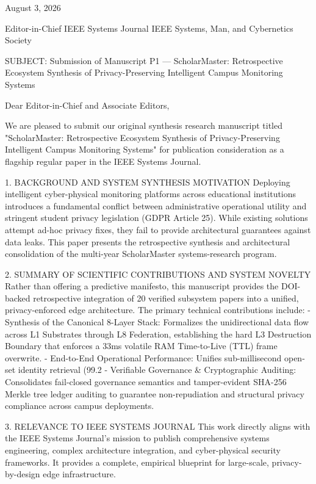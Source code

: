 August 3, 2026

Editor-in-Chief
IEEE Systems Journal
IEEE Systems, Man, and Cybernetics Society

SUBJECT: Submission of Manuscript P1 — ScholarMaster: Retrospective Ecosystem Synthesis of Privacy-Preserving Intelligent Campus Monitoring Systems

Dear Editor-in-Chief and Associate Editors,

We are pleased to submit our original synthesis research manuscript titled "ScholarMaster: Retrospective Ecosystem Synthesis of Privacy-Preserving Intelligent Campus Monitoring Systems" for publication consideration as a flagship regular paper in the IEEE Systems Journal.

1. BACKGROUND AND SYSTEM SYNTHESIS MOTIVATION
Deploying intelligent cyber-physical monitoring platforms across educational institutions introduces a fundamental conflict between administrative operational utility and stringent student privacy legislation (GDPR Article 25). While existing solutions attempt ad-hoc privacy fixes, they fail to provide architectural guarantees against data leaks. This paper presents the retrospective synthesis and architectural consolidation of the multi-year ScholarMaster systems-research program.

2. SUMMARY OF SCIENTIFIC CONTRIBUTIONS AND SYSTEM NOVELTY
Rather than offering a predictive manifesto, this manuscript provides the DOI-backed retrospective integration of 20 verified subsystem papers into a unified, privacy-enforced edge architecture. The primary technical contributions include:
  - Synthesis of the Canonical 8-Layer Stack: Formalizes the unidirectional data flow across L1 Substrates through L8 Federation, establishing the hard L3 Destruction Boundary that enforces a 33ms volatile RAM Time-to-Live (TTL) frame overwrite.
  - End-to-End Operational Performance: Unifies sub-millisecond open-set identity retrieval (99.2%
  - Verifiable Governance & Cryptographic Auditing: Consolidates fail-closed governance semantics and tamper-evident SHA-256 Merkle tree ledger auditing to guarantee non-repudiation and structural privacy compliance across campus deployments.

3. RELEVANCE TO IEEE SYSTEMS JOURNAL
This work directly aligns with the IEEE Systems Journal's mission to publish comprehensive systems engineering, complex architecture integration, and cyber-physical security frameworks. It provides a complete, empirical blueprint for large-scale, privacy-by-design edge infrastructure.

